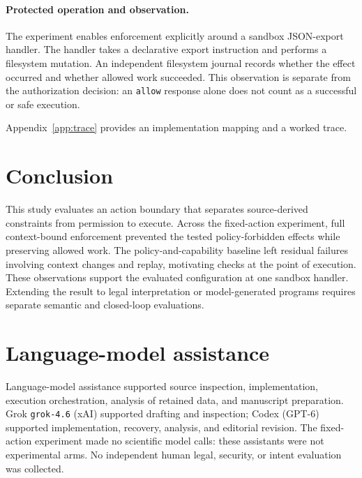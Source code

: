 \documentclass{article}
\begin{document}
\paragraph{Protected operation and observation.}
The experiment enables enforcement explicitly around a sandbox JSON-export handler. The handler takes a declarative export instruction and performs a filesystem mutation. An independent filesystem journal records whether the effect occurred and whether allowed work succeeded. This observation is separate from the authorization decision: an \texttt{allow} response alone does not count as a successful or safe execution.

Appendix~\ref{app:trace} provides an implementation mapping and a worked trace.




\section{Conclusion}

This study evaluates an action boundary that separates source-derived constraints from permission to execute. Across the fixed-action experiment, full context-bound enforcement prevented the tested policy-forbidden effects while preserving allowed work. The policy-and-capability baseline left residual failures involving context changes and replay, motivating checks at the point of execution. These observations support the evaluated configuration at one sandbox handler. Extending the result to legal interpretation or model-generated programs requires separate semantic and closed-loop evaluations.\label{la-main-text-end}

\clearpage


\clearpage
\appendix


\section{Language-model assistance}
\label{app:disclosure}
Language-model assistance supported source inspection, implementation, execution orchestration, analysis of retained data, and manuscript preparation. Grok \texttt{grok-4.6} (xAI) supported drafting and inspection; Codex (GPT-6) supported implementation, recovery, analysis, and editorial revision. The fixed-action experiment made no scientific model calls: these assistants were not experimental arms. No independent human legal, security, or intent evaluation was collected.

\clearpage

\end{document}
